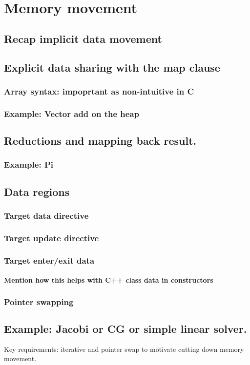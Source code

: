 

\chapter{Memory movement}
\label{chapter:memory}

\section{Recap implicit data movement}
\section{Explicit data sharing with the map clause}
\subsection{Array syntax: impoprtant as non-intuitive in C}

\subsection{Example: Vector add on the heap}

\section{Reductions and mapping back result.}
\subsection{Example: Pi}

\section{Data regions}
\subsection{Target data directive}
\subsection{Target update directive}
\subsection{Target enter/exit data}
\subsubsection{Mention how this helps with C++ class data in constructors}

\subsection{Pointer swapping}

\section{Example: Jacobi or CG or simple linear solver.}
Key requirements: iterative and pointer swap to motivate cutting down memory movement.


